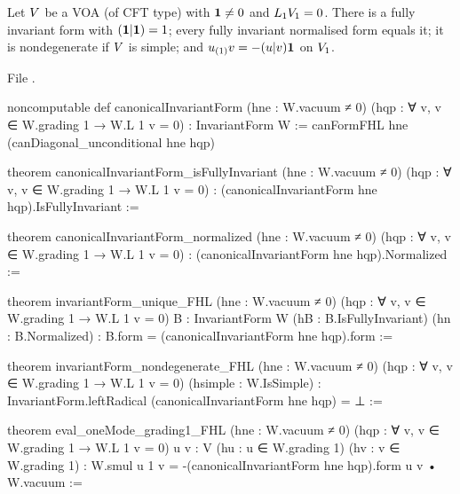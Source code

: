 \begin{theorem}\label{l04:thm:canonical}
Let $V$ be a VOA (of CFT type) with $\mathbf{1}\ne0$ and $L_1V_1 = 0$. There is a fully invariant form
with $(\mathbf{1}|\mathbf{1}) = 1$; every fully invariant normalised form equals it; it is nondegenerate if
$V$ is simple; and $u_{(1)}v = -(u|v)\mathbf{1}$ on $V_1$.
\end{theorem}
\noindent File .
\begin{leancode}
noncomputable def canonicalInvariantForm (hne : W.vacuum ≠ 0)
    (hqp : ∀ v, v ∈ W.grading 1 → W.L 1 v = 0) : InvariantForm W :=
  canFormFHL hne (canDiagonal_unconditional hne hqp)

theorem canonicalInvariantForm_isFullyInvariant (hne : W.vacuum ≠ 0)
    (hqp : ∀ v, v ∈ W.grading 1 → W.L 1 v = 0) :
    (canonicalInvariantForm hne hqp).IsFullyInvariant :=

theorem canonicalInvariantForm_normalized (hne : W.vacuum ≠ 0)
    (hqp : ∀ v, v ∈ W.grading 1 → W.L 1 v = 0) :
    (canonicalInvariantForm hne hqp).Normalized :=

theorem invariantForm_unique_FHL (hne : W.vacuum ≠ 0)
    (hqp : ∀ v, v ∈ W.grading 1 → W.L 1 v = 0) {B : InvariantForm W}
    (hB : B.IsFullyInvariant) (hn : B.Normalized) :
    B.form = (canonicalInvariantForm hne hqp).form :=

theorem invariantForm_nondegenerate_FHL (hne : W.vacuum ≠ 0)
    (hqp : ∀ v, v ∈ W.grading 1 → W.L 1 v = 0) (hsimple : W.IsSimple) :
    InvariantForm.leftRadical (canonicalInvariantForm hne hqp) = ⊥ :=

theorem eval_oneMode_grading1_FHL (hne : W.vacuum ≠ 0)
    (hqp : ∀ v, v ∈ W.grading 1 → W.L 1 v = 0) {u v : V}
    (hu : u ∈ W.grading 1) (hv : v ∈ W.grading 1) :
    W.smul u 1 v = -(canonicalInvariantForm hne hqp).form u v • W.vacuum :=
\end{leancode}
